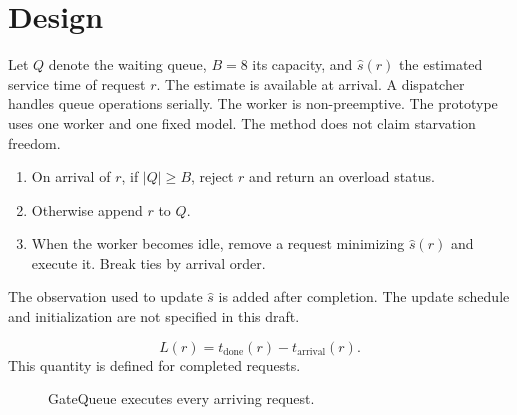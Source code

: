 \section{Design}\label{sec:design}
Let $Q$ denote the waiting queue, $B=8$ its capacity, and $\hat{s}(r)$ the
estimated service time of request $r$. The estimate is available at arrival.
A dispatcher handles queue operations serially. The worker is non-preemptive.
The prototype uses one worker and one fixed model. The method does not claim
starvation freedom.

\begin{enumerate}
\item On arrival of $r$, if $|Q|\ge B$, reject $r$ and return an overload status.
\item Otherwise append $r$ to $Q$.
\item When the worker becomes idle, remove a request minimizing $\hat{s}(r)$
and execute it. Break ties by arrival order.
\end{enumerate}

The observation used to update $\hat{s}$ is added after completion. The update
schedule and initialization are not specified in this draft.

\begin{equation}\label{eq:latency}
L(r)=t_{\mathrm{done}}(r)-t_{\mathrm{arrival}}(r).
\end{equation}
This quantity is defined for completed requests.

\begin{figure}[h]
\centering
{}
\caption{GateQueue executes every arriving request.}\label{fig:path}
\end{figure}
